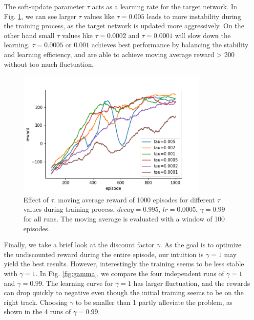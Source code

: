 \documentclass[conference]{IEEEtran}
\begin{document}
The soft-update parameter $\tau$ acts as a learning rate for the target network. In Fig. \ref{fig:tau}, we can see larger $\tau$ values like $\tau=0.005$ leads to more instability during the training process, as the target network is updated more aggressively. On the other hand small $\tau$ values like $\tau=0.0002$ and $\tau=0.0001$ will slow down the learning. $\tau=0.0005$ or $0.001$ achieves best performance by balancing the stability and learning efficiency, and are able to achieve moving average reward > 200 without too much fluctuation.

\begin{figure}
	\includegraphics[height=2.5in]{figures/tau.png} 
	\caption{Effect of $\tau$. moving average reward of 1000 episodes for different $\tau$ values during training process. $decay=0.995$, $lr=0.0005$, $\gamma=0.99$ for all runs. The moving average is evaluated with a window of 100 episodes.}
	\label{fig:tau}
\end{figure}
	
Finally, we take a brief look at the discount factor $\gamma$. As the goal is to optimize the undiscounted reward during the entire episode, our intuition is $\gamma=1$ may yield the best results. However, interestingly the training seems to be less stable with $\gamma=1$. In Fig. \ref{fig:gamma}, we compare the four independent runs of $\gamma=1$ and $\gamma=0.99$. The learning curve for $\gamma=1$ has larger fluctuation, and the rewards can drop quickly to negative even though the initial training seems to be on the right track. Choosing $\gamma$ to be smaller than 1 partly alleviate the problem, as shown in the 4 runs of $\gamma=0.99$.
\end{document}
